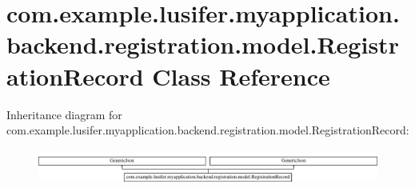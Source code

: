\hypertarget{classcom_1_1example_1_1lusifer_1_1myapplication_1_1backend_1_1registration_1_1model_1_1_registration_record}{}\section{com.\+example.\+lusifer.\+myapplication.\+backend.\+registration.\+model.\+Registration\+Record Class Reference}
\label{classcom_1_1example_1_1lusifer_1_1myapplication_1_1backend_1_1registration_1_1model_1_1_registration_record}
Inheritance diagram for com.\+example.\+lusifer.\+myapplication.\+backend.\+registration.\+model.\+Registration\+Record\+:\begin{figure}[H]
\begin{center}
\leavevmode
\includegraphics[height=1.166667cm]{classcom_1_1example_1_1lusifer_1_1myapplication_1_1backend_1_1registration_1_1model_1_1_registration_record}
\end{center}
\end{figure}

